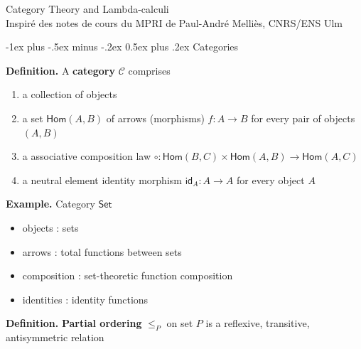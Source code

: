 \documentclass[10pt,landscape,a4paper]{article}
\makeatletter
\renewcommand{\section}{\@startsection{section}{1}{0mm}%
                                {-1ex plus -.5ex minus -.2ex}%
                                {0.5ex plus .2ex}%
                                {\normalfont\large\bfseries}}
\makeatother
\begin{document}
\raggedright
\footnotesize
\begin{multicols}{3}


\setlength{\premulticols}{1pt}
\setlength{\postmulticols}{1pt}
\setlength{\multicolsep}{1pt}
\setlength{\columnsep}{2pt}

\begin{center}
  \Large{Category Theory and Lambda-calculi} \\
  \vspace{0.3cm}
  \tiny {Inspir\'{e} des notes de cours du MPRI de Paul-Andr\'{e} Melli\`{e}s, CNRS/ENS Ulm}\\
\end{center}

\section{Categories}

\textbf{Definition.} A \textbf{category} $\mathcal C$ comprises
\begin{enumerate}\setlength{\itemsep}{-0.7mm}
\item a collection of objects
\item a set $\mathsf{Hom} (A, B)$ of arrows (morphisms) $f : A \rightarrow B$ for every pair of objects $(A, B)$
\item a associative composition law $\circ : \mathsf{Hom} (B, C) \times \mathsf{Hom} (A, B) \rightarrow \mathsf{Hom} (A, C)$
\item a neutral element identity morphism $\mathsf{id}_A : A \rightarrow A$ for every object $A$
\end{enumerate}

\textbf{Example.} Category $\mathsf{Set}$
\begin{itemize}\setlength{\itemsep}{-0.7mm}
\item objects : sets
\item arrows : total functions between sets
\item composition : set-theoretic function composition
\item identities : identity functions
\end{itemize}

\textbf{Definition.} \textbf{Partial ordering} $\leq_P$ on set $P$ is a reflexive, transitive, antisymmetric relation


\end{multicols}
\end{document}
